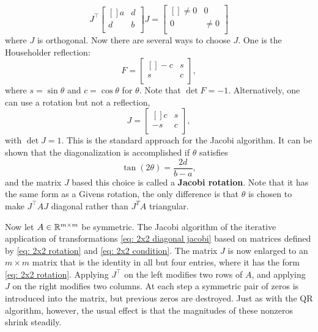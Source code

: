 \begin{equation}
\label{eq: 2x2 diagonal jacobi}
    J^\top \begin{bmatrix}[] 
        a &  d \\
        d &  b \\
    \end{bmatrix} J = \begin{bmatrix}[] 
        \neq 0 &  0 \\
        0 &  \neq 0  \\
    \end{bmatrix}  
\end{equation}
where $J$ is orthogonal. Now there are several ways to choose $J$. One is the Householder reflection: 
\begin{equation}
\label{eq: 2x2 householder}
    F = \begin{bmatrix}[] 
        -c &  s \\
        s &  c \\
    \end{bmatrix}, 
\end{equation}
where $s=\sin \theta $ and $c=\cos \theta $ for $\theta $. Note that $\det F = -1$. Alternatively, one can use a rotation but not a reflection, 
\begin{equation}
\label{eq: 2x2 rotation}
    J = \begin{bmatrix}[] 
        c &  s \\
        -s &  c \\
    \end{bmatrix}, 
\end{equation}
with $\det J = 1$. This is the standard approach for the Jacobi algorithm. It can be shown that the diagonalization is accomplished if $\theta $ satisfies 
\begin{equation}
\label{eq: 2x2 condition}
    \tan(2 \theta ) = \frac{2d}{b-a}, 
\end{equation}
and the matrix $J$ based this choice is called a \textbf{Jacobi rotation}. Note that it has the same form as a Givens rotation, the only difference is that $\theta $ is chosen to make $J^\top A J$ diagonal rather than $ J^T A $ triangular. 

Now let $ A\in \mathbb{R}^{m \times  m} $ be symmetric. The Jacobi algorithm of the iterative application of transformations \eqref{eq: 2x2 diagonal jacobi} based on matrices defined by \eqref{eq: 2x2 rotation} and \eqref{eq: 2x2 condition}. The matrix $J$ is now enlarged to an $ m\times m $ matrix that is the identity in all but four entries, where it has the form \eqref{eq: 2x2 rotation}. Applying $ J^\top  $ on the left modifies two rows of $ A $, and applying $ J $ on the right modifies two columns. At each step a symmetric pair of zeros is introduced into the matrix, but previous zeros are destroyed. Just as with the QR algorithm, however, the usual effect is that the magnitudes of these nonzeros shrink steadily. 


